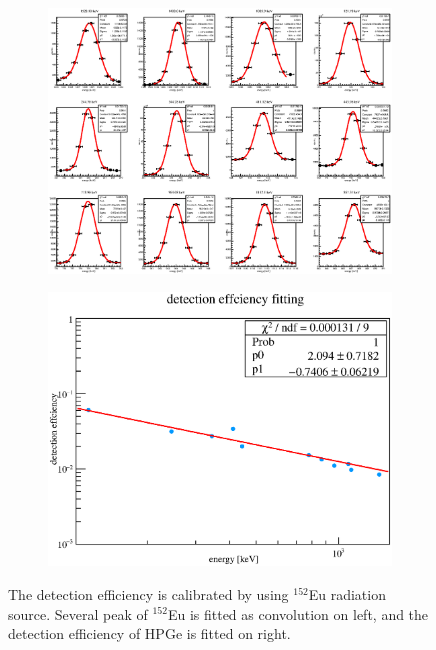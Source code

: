   \begin{figure}[H]
   \begin{subfigure}{0.3\textwidth}
    \centering
	\includegraphics[scale=0.46]{chapter4/fig/Eufit.eps}
   \end{subfigure}
   \hspace{0.25\textwidth}
   \begin{subfigure}{0.3\textwidth}
    \centering
	\includegraphics[scale=0.35]{chapter4/fig/detectioneff.eps}
   \end{subfigure}
   \caption{The detection efficiency is calibrated by using $^{152}$Eu radiation source. Several peak of $^{152}$Eu is fitted as convolution on left, and the detection efficiency of HPGe is fitted on right.}
   \label{3source}
  \end{figure}
